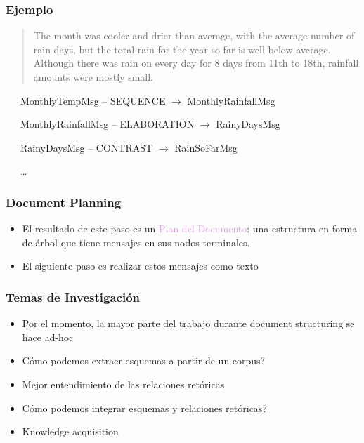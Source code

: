 \documentclass[compress,color=usenames]{beamer}
\newcommand{\mH}[1]{\textcolor{Plum}{#1}}
\begin{document}
\begin{frame}
\frametitle{Ejemplo}

\begin{quote}
The month was cooler and drier than average, with the average number of rain days, but the total rain for the year so far is well below average.  Although there was rain on every day for 8 days from 11th to 18th, rainfall amounts were mostly small.\pause
\end{quote}

\pause

\ \ \ MonthlyTempMsg  -- SEQUENCE $\to$ MonthlyRainfallMsg \pause

\ \ \ MonthlyRainfallMsg -- ELABORATION $\to $ RainyDaysMsg \pause

\ \ \ RainyDaysMsg -- CONTRAST $\to$ RainSoFarMsg\pause

\ \ \ \ldots

\end{frame}

\begin{frame}
\frametitle{Document Planning}

\begin{itemize}
\item El resultado de este paso es un \mH{Plan del Documento}: una estructura en forma de \'arbol
que tiene mensajes en sus nodos terminales.

\item El siguiente paso es realizar estos mensajes como texto
\end{itemize}
 
\end{frame}

\begin{frame}
\frametitle{Temas de Investigaci\'on}

\begin{itemize}
\item Por el momento, la mayor parte del trabajo durante document structuring se hace ad-hoc
\item C\'omo podemos extraer esquemas a partir de un corpus? 
\item Mejor entendimiento de las relaciones ret\'oricas
\item C\'omo podemos integrar esquemas y relaciones ret\'oricas?
\item Knowledge acquisition
\end{itemize}
 
\end{frame}
\end{document}
